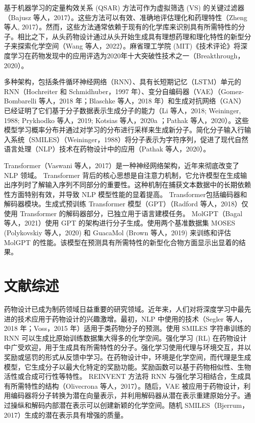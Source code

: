 基于机器学习的定量构效关系 (QSAR) 方法可作为虚拟筛选 (VS) 的关键过滤器（Bajusz 等人，2017）。这些方法可以有效、准确地评估理化和药理特性（Zheng 等人, 2017）。然而，这些方法通常依赖于现有的化学库来识别具有所需特性的分子。相比之下，从头药物设计通过从头开始生成具有理想药理和理化特性的新型分子来探索化学空间（Wang 等人，2022）。麻省理工学院 (MIT)《技术评论》将深度学习在药物发现中的应用评选为2020年十大突破性技术之一（Breakthrough，2020）。

多种架构，包括条件循环神经网络（RNN）、具有长短期记忆（LSTM）单元的 RNN（Hochreiter 和 Schmidhuber，1997 年）、变分自编码器（VAE）（Gomez-Bombarelli 等人，2018 年；Blaschke 等人，2018 年）和生成对抗网络（GAN）已经证明了它们基于分子数据表示生成分子的能力（Li 等人，2018; Weininger, 1988; Prykhodko 等人，2019; Kotsias 等人，2020a ；Pathak 等人，2020）。这些模型学习概率分布并通过对学习的分布进行采样来生成新分子。简化分子输入行输入系统（SMILES）（Weininger，1988）将分子表示为字符序列，促进了现代自然语言处理（NLP）技术在药物设计中的应用（Pathak 等人，2020）。

Transformer（Vaswani 等人，2017）是一种神经网络架构，近年来彻底改变了 NLP 领域。 Transformer 背后的核心思想是自注意力机制，它允许模型在生成输出序列时了解输入序列不同部分的重要性。这种机制在捕获文本数据中的长期依赖性方面特别有效，并导致 NLP 模型性能的显着提高。 Transformer包括编码器和解码器模块。生成式预训练 Transformer 模型（GPT）（Radford 等人，2018）仅使用 Transformer 的解码器部分，已独立用于语言建模任务。 MolGPT（Bagal 等人，2021）使用 GPT 的架构进行分子生成。使用两个基准数据集 MOSES (Polykovskiy 等人，2020) 和 GuacaMol (Brown 等人，2019) 来训练和评估 MolGPT 的性能。该模型在预测具有所需特性的新型化合物方面显示出显着的结果。

\section{文献综述}

药物设计已成为制药领域日益重要的研究领域。近年来，人们对将深度学习中最先进的技术应用于药物设计的兴趣激增。最初，NLP 中使用的技术（Segler 等人，2018 年；Voss，2015 年）适用于类药物分子的预测。使用 SMILES 字符串训练的 RNN 可以生成比原始训练数据集大得多的化学空间。强化学习 (RL) 在药物设计中广受欢迎，用于生成具有所需特性的分子。强化学习使用代理与环境交互，并以奖励或惩罚的形式从反馈中学习。在药物设计中，环境是化学空间，而代理是生成模型，它生成分子以最大化特定的奖励功能。奖励函数可以基于药物相似性、生物活性或合成可行性等特性。 REINVENT 方法将 RNN 与强化学习相结合，生成具有所需特性的结构（Olivecrona 等人，2017）。随后，VAE 被应用于药物设计，利用编码器将分子转换为潜在向量表示，并利用解码器从潜在表示重建原始分子。通过操纵和解码内部潜在表示可以创建新颖的化学空间。随机 SMILES（Bjerrum，2017）生成的潜在表示具有增强的质量。

